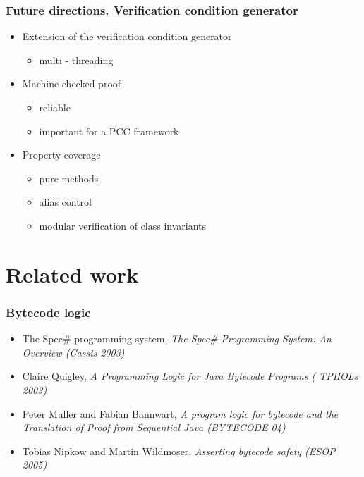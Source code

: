 \documentclass{beamer}
\begin{document}
\begin{frame}\frametitle{Future directions. Verification condition generator }
         \begin{itemize}	   
	    \item Extension of the verification condition generator 
                 \begin{itemize}
	             \item multi - threading
		  \end{itemize}
           \item Machine checked proof
                 \begin{itemize}
	             \item reliable
		       \item important for a PCC framework
		  \end{itemize}
         
    \item Property coverage  
	          \begin{itemize}
	                \item pure methods 
			  \item alias control
			  \item modular verification of class invariants
			    
		   \end{itemize}  
 \end{itemize}  
\end{frame}




\section{Related work}

\begin{frame}[shrink]\frametitle{Bytecode logic}
 \begin{itemize}
    
    
     \item  The Spec\# programming system, \textit{The Spec\# Programming System: An Overview (Cassis 2003)} 
      
     \item Claire Quigley, \textit{A Programming Logic for Java Bytecode Programs ( TPHOLs 2003)} 

      \item Peter Muller and Fabian Bannwart, \textit{A program logic for bytecode and the Translation of Proof from Sequential Java (BYTECODE 04)}
 
      \item Tobias Nipkow and Martin Wildmoser, \textit{Asserting bytecode safety (ESOP 2005)}

\end{itemize}
\end{frame}
\end{document}
